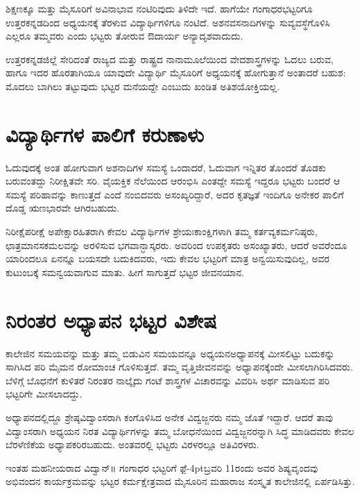 {ಶಿಕ್ಷಣಕ್ಕೂ ಮತ್ತು ಮೈಸೂರಿಗೆ ಅವಿನಾಭಾವ ನಂಟಿರಿವುದು ತಿಳಿದೇ ಇದೆ. ಹಾಗೆಯೇ  ಗಂಗಾಧರಭಟ್ಟರಿಗೂ ಉತ್ತರಕನ್ನಡದಿಂದ ಅಧ್ಯಯನಕ್ಕೆ ತೆರಳುವ ವಿದ್ಯಾರ್ಥಿಗಳಿಗೂ ನಂಟಿದೆ. ಅಶನ\enginline{-}ವಸನಾದಿಗಳನ್ನು ಸುವ್ಯವಸ್ಥೆಗೊಳಿಸಿ ಎಲ್ಲರೂ ತಮ್ಮವರು ಎಂದು ಭಟ್ಟರು ತೋರುವ ಔದಾರ್ಯ ಅನ್ಯಾದೃಶವಾದುದು.

ಉತ್ತರಕನ್ನಡಜಿಲ್ಲೆ ಸೇರಿದಂತೆ ರಾಜ್ಯದ ಮತ್ತು ರಾಷ್ಟ್ರದ ನಾನಾಮೂಲೆಯಿಂದ ವೇದ\enginline{-}ಶಾಸ್ತ್ರಗಳನ್ನು ಓದಲು ಬರುವ, ಹಾಗೂ ಇದರ ಹೊರತಾಗಿಯೂ ಯಾವುದೇ ವಿದ್ಯಾರ್ಥಿ ಮೈಸೂರಿಗೆ ಅಧ್ಯಯನಕ್ಕೆ ಹೋಗುತ್ತಾನೆ ಅಂತಾದರೆ ಬಹುಶ: ಮೊದಲು ಬಾಗಿಲು ತಟ್ಟುವುದು  ಭಟ್ಟರ ಮನೆಯದ್ದೇ ಎಂಬುದು ಖಂಡಿತ ಅತಿಶಯೋಕ್ತಿಯಲ್ಲ. 

\section*{ವಿದ್ಯಾರ್ಥಿಗಳ ಪಾಲಿಗೆ ಕರುಣಾಳು}

ಓದುವುದಕ್ಕೆ ಅಂತ ಹೋಗುವಾಗ ಅಶನಾದಿಗಳ ಸಮಸ್ಯೆ ಒಂದಾದರೆ, ಓದುವಾಗ ಇನ್ನಿತರ ತೊಂದರೆ ತೊಡಕು ಬರುವಂತದ್ದು ನಿರೀಕ್ಷಿತವೇ ಸರಿ. ವೈಯಕ್ತಿಕ ನೆಲೆಯಿಂದ ಆರಂಭಿಸಿ ಎಂತದ್ದೇ ಸಮಸ್ಯೆ ಇದ್ದರೂ ಭಟ್ಟರು ಬಂದರೆ ಆ ಸಮಸ್ಯೆ ಪರಿಹಾವನ್ನು ಕಾಣುತ್ತದೆ ಎಂದೆ ನಂಬಿದವರು ಅಸಂಖ್ಯರಿದ್ದಾರೆ, ಅದರ ಕೃತಜ್ಞತೆ ಇಂದಿಗೂ ಅನೇಕರ ಪಾಲಿಗೆ ದೊಡ್ಡ ಋಣಭಾರವೇ ಆಗಿರಬಹುದು. 
\newpage

ನಿರೀಕ್ಷೆ\enginline{-}ಪರೀಕ್ಷೆ  \enginline{-}  ಅಪೇಕ್ಷಾರಹಿತರಾಗಿ ಕೇವಲ ವಿದ್ಯಾರ್ಥಿಗಳ ಶ್ರೇಯಃಕಾಂಕ್ಷಿಗ\-ಳಾಗಿ ತಮ್ಮ ಕರ್ತವ್ಯಕರ್ಮನಿಷ್ಠರು, ಛಾತ್ರಮಾನಸಕಮಲವನ್ನು ಅರಳಿಸುವ ಭಗವಾನ್\break ಭಾಸ್ಕರರು. ಅವರಿಂದ ಉಪಕೃತರು ಅಸಂಖ್ಯಾತರು, ಆದರೆ ಅವರೆಂದೂ ಯಾರಿಂದಲೂ ಏನನ್ನೂ ಬಯಸದೇ ಬದುಕಿದವರು, ಇದು ಕೇವಲ ಭಟ್ಟರಿಗೆ ಮಾತ್ರ ಅನ್ವಯಿಸುವುದಿಲ್ಲ, ಅವರ ಕುಟುಂಬಕ್ಕೆ ಸಮನ್ವಯವಾಗುವ ಮಾತು. ಹೀಗೆ ಸಾಗುತ್ತದೆ  ಭಟ್ಟರ ಜೀವನಯಾನ.

\section*{ನಿರಂತರ ಅಧ್ಯಾಪನ   \enginline{-}   ಭಟ್ಟರ ವಿಶೇಷ}

ಕಾಲೇಜಿನ ಸಮಯವನ್ನು ಮತ್ತು ತಮ್ಮ ಬಿಡುವಿನ ಸಮಯವನ್ನೂ ಅಧ್ಯಯನ\enginline{-}ಅಧ್ಯಾಪನಕ್ಕೆ ಮೀಸಲಿಟ್ಟು ಬದುಕನ್ನು ಸಾಗಿಸಿದ ಪರಿ ಮೈಮನ ರೋಮಾಂಚ ಗೊಳಿಸುತ್ತದೆ. ತಮ್ಮ ವೃತ್ತಿಜೀವನವನ್ನು ಅಧ್ಯಾಪನಕ್ಕೆಂದೇ ಮೀಸಲಾಗಿರಿಸಿದವರು. ಬೆಳಿಗ್ಗೆ ಬೊಧನೆಗೆ ಕುಳಿತರೆ ನಿರಂತರ ನಾಲ್ಕೈದು ಗಂಟೆ ಶಾಸ್ತ್ರಗಳ ವಿಚಾರವನ್ನು ವಿವರಿಸಿ ಅರ್ಥ ಮಾಡಿಸುವ ಪರಿ ಭಟ್ಟರಿಗೇ ಮೀಸಲಾದದ್ದು.

ಅಧ್ಯಾಪನದಲ್ಲಿದ್ದೂ ಶ್ರೇಷ್ಠವಿದ್ವಾಂಸರಾಗಿ  ಕಂಗೊಳಿಸಿದ ಅನೇಕ ವಿದ್ವಜ್ಜನರು ನಮ್ಮ ಜೊತೆ ಇದ್ದಾರೆ. ಆದರೆ ತಾವು ವಿದ್ವಾಂಸರಾಗಿ ಅಧ್ಯಯನ ನಿರತ ವಿದ್ಯಾರ್ಥಿಗಳನ್ನು ತಮ್ಮ ಬೋಧನೆಯಿಂದ ವಿದ್ವಜ್ಜನರನ್ನಾಗಿ ಸಿದ್ಧ ಮಾಡಿದವರು ಕೇವಲ ಬೆರಳೆಣಿಕೆಯ ಅಧ್ಯಾಪಕ\-ರಿರಬಹುದು. ಅಂತವರಲ್ಲಿ ಭಟ್ಟರು ವಿರಳರಲ್ಲೂ ಅತಿವಿರಳರು.

ಇಂತಹ ಮಹನೀಯರಾದ ವಿದ್ವಾನ್॥ ಗಂಗಾಧರ ಭಟ್ಟರಿಗೆ ಫ಼ೆ\kern -4ptಬ್ರವರಿ 11ರಂದು ಅವರ ಶಿಷ್ಯವೃಂದವು  ಅಭಿವಂದನ ಕಾರ್ಯಕ್ರಮವನ್ನು ಭಟ್ಟರ ಕರ್ಮಕ್ಷೇತ್ರವಾದ ಮೈಸೂರಿನ ಮಹಾರಾಜ ಸಂಸ್ಕೃತ ಕಾಲೇಜಿನಲ್ಲಿ ಏರ್ಪಡಿಸಿತ್ತು. 

}
